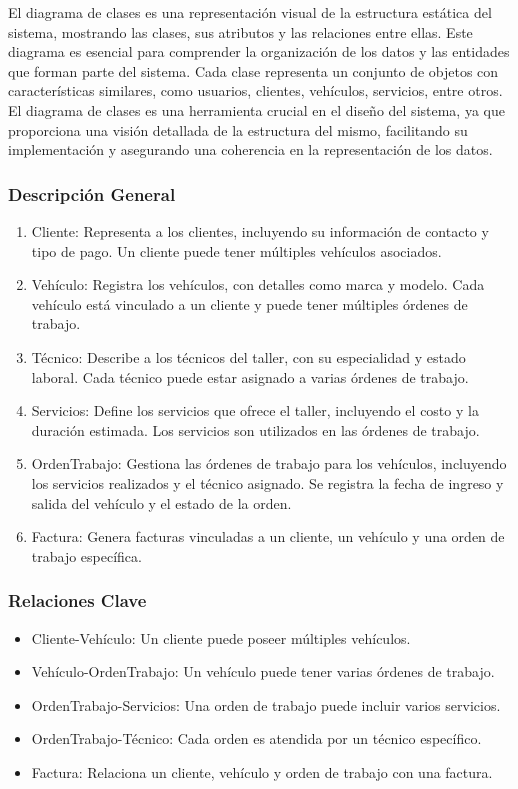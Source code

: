 El diagrama de clases es una representación visual de la estructura estática del sistema, mostrando las clases, sus atributos y las relaciones entre ellas. Este diagrama es esencial para comprender la organización de los datos y las entidades que forman parte del sistema. Cada clase representa un conjunto de objetos con características similares, como usuarios, clientes, vehículos, servicios, entre otros. El diagrama de clases es una herramienta crucial en el diseño del sistema, ya que proporciona una visión detallada de la estructura del mismo, facilitando su implementación y asegurando una coherencia en la representación de los datos.

\subsubsection*{Descripción General}
\begin{enumerate}
    \item Cliente: Representa a los clientes, incluyendo su información de contacto y tipo de pago. Un cliente puede tener múltiples vehículos asociados.
    \item Vehículo: Registra los vehículos, con detalles como marca y modelo. Cada vehículo está vinculado a un cliente y puede tener múltiples órdenes de trabajo.
    \item Técnico: Describe a los técnicos del taller, con su especialidad y estado laboral. Cada técnico puede estar asignado a varias órdenes de trabajo.
    \item Servicios: Define los servicios que ofrece el taller, incluyendo el costo y la duración estimada. Los servicios son utilizados en las órdenes de trabajo.
    \item OrdenTrabajo: Gestiona las órdenes de trabajo para los vehículos, incluyendo los servicios realizados y el técnico asignado. Se registra la fecha de ingreso y salida del vehículo y el estado de la orden.
    \item Factura: Genera facturas vinculadas a un cliente, un vehículo y una orden de trabajo específica.
\end{enumerate}

\subsubsection*{Relaciones Clave}
\begin{itemize}
    \item Cliente-Vehículo: Un cliente puede poseer múltiples vehículos.
    \item Vehículo-OrdenTrabajo: Un vehículo puede tener varias órdenes de trabajo.
    \item OrdenTrabajo-Servicios: Una orden de trabajo puede incluir varios servicios.
    \item OrdenTrabajo-Técnico: Cada orden es atendida por un técnico específico.
    \item Factura: Relaciona un cliente, vehículo y orden de trabajo con una factura.    
\end{itemize}

